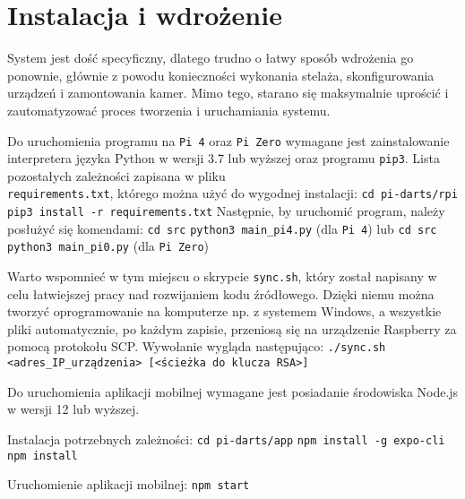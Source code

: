 \chapter{Instalacja i wdrożenie}
\thispagestyle{chapterBeginStyle}

System jest dość specyficzny, dlatego trudno o łatwy sposób wdrożenia go ponownie, głównie z powodu konieczności wykonania stelaża, skonfigurowania urządzeń i zamontowania kamer. Mimo tego, starano się maksymalnie uprościć i zautomatyzować proces tworzenia i uruchamiania systemu.

Do uruchomienia programu na \verb|Pi 4| oraz \verb|Pi Zero| wymagane jest zainstalowanie interpretera języka Python w wersji 3.7 lub wyższej oraz programu \verb|pip3|. Lista pozostałych zależności zapisana w pliku \\ \verb|requirements.txt|, którego można użyć do wygodnej instalacji:
\newline \newline
\indent \verb|cd pi-darts/rpi| \newline
\indent \verb|pip3 install -r requirements.txt|
\newline \newline
\noindent Następnie, by uruchomić program, należy posłużyć się komendami: \newline \newline
\indent \verb|cd src| \newline
\indent \verb|python3 main_pi4.py| (dla \verb|Pi 4|) \newline\newline lub \indent \newline \newline \indent \verb|cd src| \newline \indent \verb|python3 main_pi0.py| (dla \verb|Pi Zero|) \newline

Warto wspomnieć w tym miejscu o skrypcie \verb|sync.sh|, który został napisany w celu łatwiejszej pracy nad rozwijaniem kodu źródłowego. Dzięki niemu można tworzyć oprogramowanie na komputerze np. z systemem Windows, a wszystkie pliki automatycznie, po każdym zapisie, przeniosą się na urządzenie Raspberry za pomocą protokołu SCP. Wywołanie wygląda następująco:
\newline \newline
\indent \verb|./sync.sh <adres_IP_urządzenia> [<ścieżka do klucza RSA>]|
\newline

Do uruchomienia aplikacji mobilnej wymagane jest posiadanie środowiska Node.js w wersji 12 lub wyższej. 

\noindent Instalacja potrzebnych zależności:
\newline \newline
\indent \verb|cd pi-darts/app| \newline
\indent \verb|npm install -g expo-cli| \newline
\indent \verb|npm install| \newline

\noindent Uruchomienie aplikacji mobilnej:
\newline \newline
\indent \verb|npm start| 
